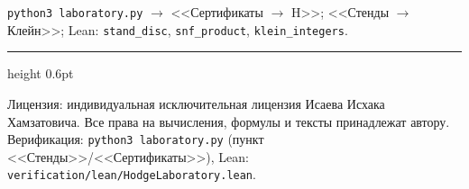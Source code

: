 \documentclass[11pt,a4paper]{article}
\theoremstyle{plain}
\theoremstyle{definition}
\theoremstyle{remark}
\begin{document}
\begin{verifybox}
\texttt{python3 laboratory.py} $\to$ <<Сертификаты $\to$ H>>;
<<Стенды $\to$ Клейн>>; Lean: \texttt{stand\_disc},
\texttt{snf\_product}, \texttt{klein\_integers}.
\end{verifybox}

\vfill
{\color{linkblue}\hrule height 0.6pt}
\vspace{0.5em}
{\small\color{gray}
Лицензия: индивидуальная исключительная лицензия Исаева Исхака Хамзатовича.
Все права на вычисления, формулы и тексты принадлежат автору.
Верификация: \texttt{python3 laboratory.py} (пункт <<Стенды>>/<<Сертификаты>>),
Lean: \texttt{verification/lean/HodgeLaboratory.lean}.
}
\end{document}
